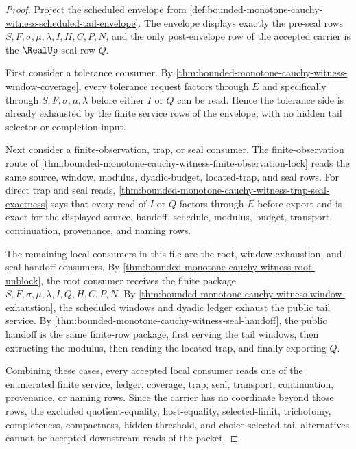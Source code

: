 \begin{proof}
Project the scheduled envelope from \autoref{def:bounded-monotone-cauchy-witness-scheduled-tail-envelope}. The envelope displays exactly the pre-seal rows $S,F,\sigma,\mu,\lambda,I,H,C,P,N$, and the only post-envelope row of the accepted carrier is the $\RealUp$ seal row $Q$.

First consider a tolerance consumer. By \autoref{thm:bounded-monotone-cauchy-witness-window-coverage}, every tolerance request factors through $E$ and specifically through $S,F,\sigma,\mu,\lambda$ before either $I$ or $Q$ can be read. Hence the tolerance side is already exhausted by the finite service rows of the envelope, with no hidden tail selector or completion input.

Next consider a finite-observation, trap, or seal consumer. The finite-observation route of \autoref{thm:bounded-monotone-cauchy-witness-finite-observation-lock} reads the same source, window, modulus, dyadic-budget, located-trap, and seal rows. For direct trap and seal reads, \autoref{thm:bounded-monotone-cauchy-witness-trap-seal-exactness} says that every read of $I$ or $Q$ factors through $E$ before export and is exact for the displayed source, handoff, schedule, modulus, budget, transport, continuation, provenance, and naming rows.

The remaining local consumers in this file are the root, window-exhaustion, and seal-handoff consumers. By \autoref{thm:bounded-monotone-cauchy-witness-root-unblock}, the root consumer receives the finite package $S,F,\sigma,\mu,\lambda,I,Q,H,C,P,N$. By \autoref{thm:bounded-monotone-cauchy-witness-window-exhaustion}, the scheduled windows and dyadic ledger exhaust the public tail service. By \autoref{thm:bounded-monotone-cauchy-witness-seal-handoff}, the public handoff is the same finite-row package, first serving the tail windows, then extracting the modulus, then reading the located trap, and finally exporting $Q$.

Combining these cases, every accepted local consumer reads one of the enumerated finite service, ledger, coverage, trap, seal, transport, continuation, provenance, or naming rows. Since the carrier has no coordinate beyond those rows, the excluded quotient-equality, host-equality, selected-limit, trichotomy, completeness, compactness, hidden-threshold, and choice-selected-tail alternatives cannot be accepted downstream reads of the packet.
\end{proof}
